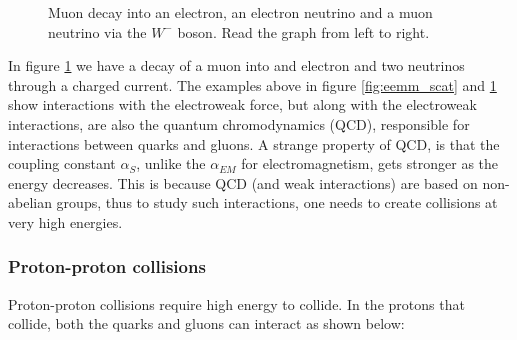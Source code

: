 \begin{figure}[H]
    \centering
    
    \caption[Muon decay diagram]{Muon decay into an electron, an electron neutrino and a muon neutrino via the $W^{-}$ boson. Read the graph from left to right.}
    \label{fig:mw_decay}
\end{figure}

In figure \ref{fig:mw_decay} we have a decay of a muon into and electron and two neutrinos through a charged current. 
 The examples above in figure \ref{fig:eemm_scat} and \ref{fig:mw_decay} show interactions with 
the electroweak force, but along with the electroweak interactions, are also the quantum chromodynamics (QCD), 
responsible for interactions between quarks and gluons. A strange property of QCD,
is that the coupling constant $\alpha_{S}$, unlike the $\alpha_{EM}$ for electromagnetism,
gets stronger as the energy decreases. This is because QCD (and weak interactions) are based on non-abelian 
groups\cite{Peskin:1995ev}, thus to study such interactions, one needs to create collisions at very high energies. 

\subsubsection*{Proton-proton collisions}
Proton-proton collisions require high energy to collide. In the protons that collide, both the quarks and gluons
can interact as shown below:

